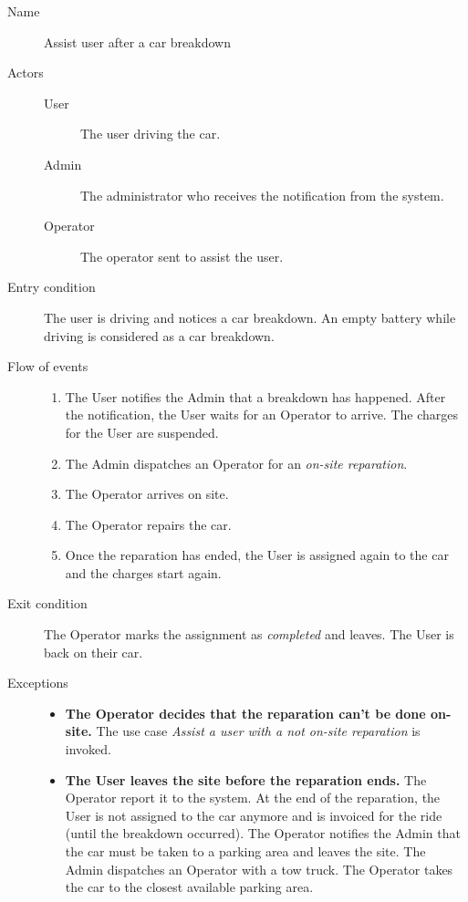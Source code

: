 		\begin{description}
			\item[Name] Assist user after a car breakdown
			\item[Actors] \hfill
			\begin{description}
				\item[User] The user driving the car.
				\item[Admin] The administrator who receives the notification from the system.
				\item[Operator] The operator sent to assist the user.
			\end{description}
			\item[Entry condition] The user is driving and notices a car breakdown. An empty battery while driving is considered as a car breakdown.
			\item[Flow of events] \hfill
			\begin{enumerate}
				\item The User notifies the Admin that a breakdown has happened. After the notification, the User waits for an Operator to arrive. The charges for the User are suspended.
				\item The Admin dispatches an Operator for an \textit{on-site reparation}.
				\item The Operator arrives on site.
				\item The Operator repairs the car.
				\item Once the reparation has ended, the User is assigned again to the car and the charges start again.
			\end{enumerate}
			\item[Exit condition] The Operator marks the assignment as \textit{completed} and leaves. The User is back on their car.
			\item[Exceptions] \hfill
			\begin{itemize}
				\item \textbf{The Operator decides that the reparation can't be done on-site.} The use case \textit{Assist a user with a not on-site reparation} is invoked.
				\item \textbf{The User leaves the site before the reparation ends.} The Operator report it to the system. At the end of the reparation, the User is not assigned to the car anymore and is invoiced for the ride (until the breakdown occurred). The Operator notifies the Admin that the car must be taken to a parking area and leaves the site. The Admin dispatches an Operator with a tow truck. The Operator takes the car to the closest available parking area.

\end{itemize}
\end{description}
